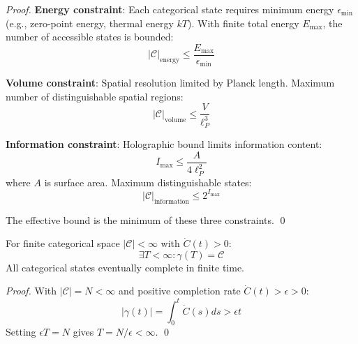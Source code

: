 \begin{proof}
\textbf{Energy constraint}: Each categorical state requires minimum energy $\epsilon_{\text{min}}$ (e.g., zero-point energy, thermal energy $kT$). With finite total energy $E_{\text{max}}$, the number of accessible states is bounded:
\begin{equation}
|\mathcal{C}|_{\text{energy}} \leq \frac{E_{\text{max}}}{\epsilon_{\text{min}}}
\end{equation}

\textbf{Volume constraint}: Spatial resolution limited by Planck length. Maximum number of distinguishable spatial regions:
\begin{equation}
|\mathcal{C}|_{\text{volume}} \leq \frac{V}{\ell_P^3}
\end{equation}

\textbf{Information constraint}: Holographic bound limits information content:
\begin{equation}
I_{\text{max}} \leq \frac{A}{4\ell_P^2}
\end{equation}
where $A$ is surface area. Maximum distinguishable states:
\begin{equation}
|\mathcal{C}|_{\text{information}} \leq 2^{I_{\text{max}}}
\end{equation}

The effective bound is the minimum of these three constraints. \qed
\end{proof}

\begin{corollary}
\label{cor:eventual_completion}
For finite categorical space $|\mathcal{C}| < \infty$ with $\dot{C}(t) > 0$:
\begin{equation}
\exists T < \infty: \gamma(T) = \mathcal{C}
\end{equation}
All categorical states eventually complete in finite time.
\end{corollary}

\begin{proof}
With $|\mathcal{C}| = N < \infty$ and positive completion rate $\dot{C}(t) > \epsilon > 0$:
\begin{equation}
|\gamma(t)| = \int_0^t \dot{C}(s) ds > \epsilon t
\end{equation}
Setting $\epsilon T = N$ gives $T = N/\epsilon < \infty$. \qed
\end{proof}
